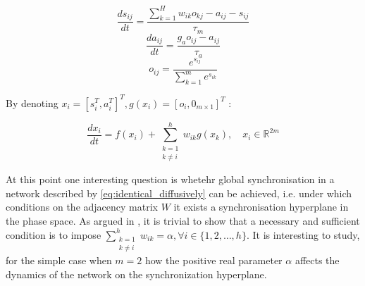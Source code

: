 \begin{equation}
    \frac{ds_{ij}}{dt} = \frac{\sum\limits_{k=1}^H w_{ik}o_{kj}-a_{ij}-s_{ij} }{\tau_m} 
    \label{eq:sij_net}
\end{equation}
\begin{equation}
    \frac{da_{ij}}{dt} = \frac{g_ao_{ij}-a_{ij}}{\tau_a} 
    \label{eq:aij_net}
\end{equation}
\begin{equation}
    o_{ij} = \frac{e^{s_{ij}}}{ \sum\limits_{k=1}^m e^{s_{ik}}}
    \label{eq:oij_net}
\end{equation}

By denoting $x_i=[s_i^T, a_i^T]^{T}, g(x_i)=[o_i, 0_{m \times 1}]^T$ :

\begin{equation}
    \frac{dx_i}{dt} = f(x_i) +\sum\limits_{\substack{k=1 \\ k\neq i}}^h w_{ik}g(x_k),\quad x_i \in \mathbb{R}^{2m}
    \label{eq:identical_diffusively}
\end{equation}

At this point one interesting question is whetehr global synchronisation in a network described by \cref{eq:identical_diffusively} can be achieved, i.e. under which conditions on the adjacency matrix $W$ it exists a synchronisation hyperplane in the phase space. As argued in \cite{pecora2015master}, it is trivial to show that a necessary and sufficient condition is to impose $\sum\limits_{\substack{k=1 \\ k\neq i}}^h w_{ik} = \alpha, \forall i \in \{1,2,\dots,h \}$. It is interesting to study, for the simple case when $m=2$ how the positive real parameter $\alpha$ affects the dynamics of the network on the synchronization hyperplane. 

